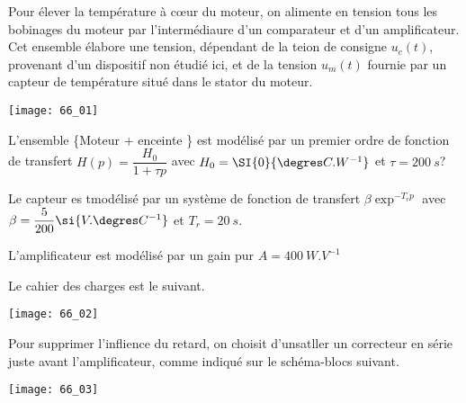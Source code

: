 \normaltrue \difficilefalse \tdifficilefalse
\correctionfalse

\setcounter{question}{0}


\ifcorrection
\else
{}
\fi


\ifprof
\else
Pour élever la température à c\oe{}ur du moteur, on alimente en tension tous les bobinages du moteur par l'intermédiaure d'un comparateur et d'un amplificateur. Cet ensemble élabore une tension, dépendant de la teion de consigne $u_c(t)$, provenant d'un dispositif non étudié ici, et de la tension $u_m(t)$ fournie par un capteur de température situé dans le stator du moteur. 

\begin{center}
\texttt{[image: 66\_01]}
\end{center}


L'ensemble \{Moteur + enceinte \} est modélisé par un premier ordre de fonction de transfert $H(p)=\dfrac{H_0}{1+\tau p}$
avec $H_0 = \SI{0}{\degres C.W^{-1}}$ et $\tau=\SI{200}{s}$?

Le capteur es tmodélisé par un système de fonction de transfert $\beta \exp^{-T_r p}$ avec $\beta = \dfrac{5}{200}\si{V.\degres C^{-1}}$ et $T_r = \SI{20}{s}$.

L'amplificateur est modélisé par un gain pur $A= \SI{400}{W.V^{-1}}$

Le cahier des charges est le suivant. 

\begin{center}
\texttt{[image: 66\_02]}
\end{center}
\fi

\ifprof
\else 
\fi


\ifprof
\else 
Pour supprimer l'inflience du retard, on choisit d'unsatller un correcteur en série juste avant l'amplificateur, comme indiqué sur le schéma-blocs suivant. 

\begin{center}
\texttt{[image: 66\_03]}
\end{center}
\fi

